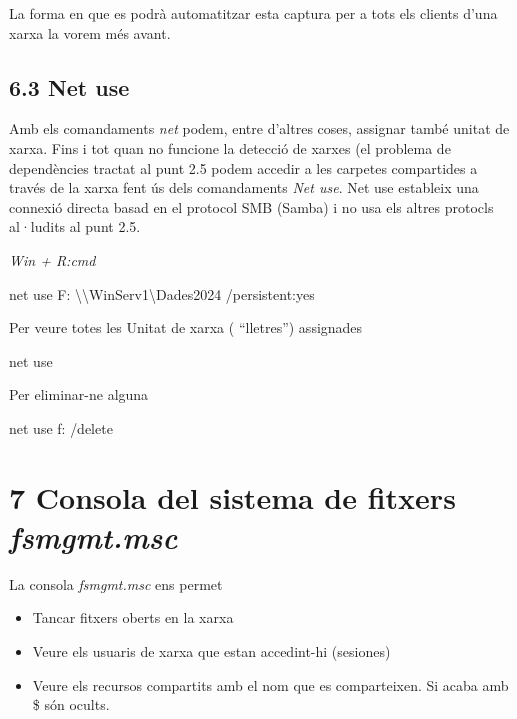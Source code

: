 \documentclass[
  a4paper,
]{article}
\newenvironment{Shaded}{\begin{snugshade}}{\end{snugshade}}
\newcommand{\AttributeTok}[1]{\textcolor[rgb]{0.13,0.29,0.53}{#1}}
\newcommand{\NormalTok}[1]{#1}
\providecommand{\tightlist}{%
  \setlength{\itemsep}{0pt}\setlength{\parskip}{0pt}}
\begin{document}
La forma en que es podrà automatitzar esta captura per a tots els
clients d'una xarxa la vorem més avant.

\subsection{6.3 Net use}\label{net-use}

Amb els comandaments \emph{net} podem, entre d'altres coses, assignar
també unitat de xarxa. Fins i tot quan no funcione la detecció de xarxes
(el problema de dependències tractat al punt 2.5 podem accedir a les
carpetes compartides a través de la xarxa fent ús dels comandaments
\emph{Net use}. Net use estableix una connexió directa basad en el
protocol SMB (Samba) i no usa els altres protocls al·ludits al punt 2.5.

\emph{Win + R:cmd}

\begin{Shaded}
\begin{Highlighting}[]
\NormalTok{net use F: \textbackslash{}\textbackslash{}WinServ1\textbackslash{}Dades2024 }\AttributeTok{/persistent:}\NormalTok{yes}
\end{Highlighting}
\end{Shaded}

Per veure totes les Unitat de xarxa ( ``lletres'') assignades

\begin{Shaded}
\begin{Highlighting}[]
\NormalTok{net use}
\end{Highlighting}
\end{Shaded}

Per eliminar-ne alguna

\begin{Shaded}
\begin{Highlighting}[]
\NormalTok{net use f: }\AttributeTok{/delete}
\end{Highlighting}
\end{Shaded}

\section{\texorpdfstring{7 Consola del sistema de fitxers
\emph{fsmgmt.msc}}{7 Consola del sistema de fitxers fsmgmt.msc}}\label{consola-del-sistema-de-fitxers-fsmgmt.msc}

La consola \emph{fsmgmt.msc} ens permet

\begin{itemize}
\tightlist
\item
  Tancar fitxers oberts en la xarxa
\item
  Veure els usuaris de xarxa que estan accedint-hi (sesiones)
\item
  Veure els recursos compartits amb el nom que es comparteixen. Si acaba
  amb \$ són ocults.
\end{itemize}
\end{document}
